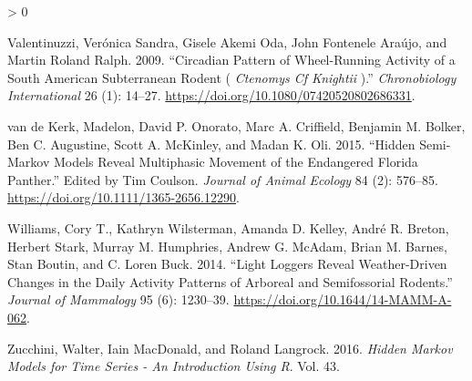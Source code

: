 \documentclass[english,msc,numbers,hidelinks]{coppe}
\newlength{\cslhangindent}
\newenvironment{CSLReferences}[2] %
 {%
  \setlength{\parindent}{0pt}
  \ifodd #1 \everypar{\setlength{\hangindent}{\cslhangindent}}\ignorespaces\fi
  \ifnum #2 > 0
  \setlength{\parskip}{#2\baselineskip}
  \fi
 }%
 {}
\begin{document}
\begin{CSLReferences}{1}{0}
  \leavevmode\hypertarget{ref-valentinuzzi2009}{}%
  Valentinuzzi, Verónica Sandra, Gisele Akemi Oda, John Fontenele Araújo, and Martin Roland Ralph. 2009. {``Circadian Pattern of Wheel{-}Running Activity of a South American Subterranean Rodent ( {\emph{Ctenomys Cf Knightii}} ).''} \emph{Chronobiology International} 26 (1): 14--27. \url{https://doi.org/10.1080/07420520802686331}.

  \leavevmode\hypertarget{ref-vandekerk2015}{}%
  van de Kerk, Madelon, David P. Onorato, Marc A. Criffield, Benjamin M. Bolker, Ben C. Augustine, Scott A. McKinley, and Madan K. Oli. 2015. {``Hidden Semi-Markov Models Reveal Multiphasic Movement of the Endangered Florida Panther.''} Edited by Tim Coulson. \emph{Journal of Animal Ecology} 84 (2): 576--85. \url{https://doi.org/10.1111/1365-2656.12290}.

  \leavevmode\hypertarget{ref-williams2014}{}%
  Williams, Cory T., Kathryn Wilsterman, Amanda D. Kelley, André R. Breton, Herbert Stark, Murray M. Humphries, Andrew G. McAdam, Brian M. Barnes, Stan Boutin, and C. Loren Buck. 2014. {``Light Loggers Reveal Weather-Driven Changes in the Daily Activity Patterns of Arboreal and Semifossorial Rodents.''} \emph{Journal of Mammalogy} 95 (6): 1230--39. \url{https://doi.org/10.1644/14-MAMM-A-062}.

  \leavevmode\hypertarget{ref-zucchini2016}{}%
  Zucchini, Walter, Iain MacDonald, and Roland Langrock. 2016. \emph{Hidden Markov Models for Time Series - An Introduction Using R}. Vol. 43.

  \end{CSLReferences}
\end{document}
